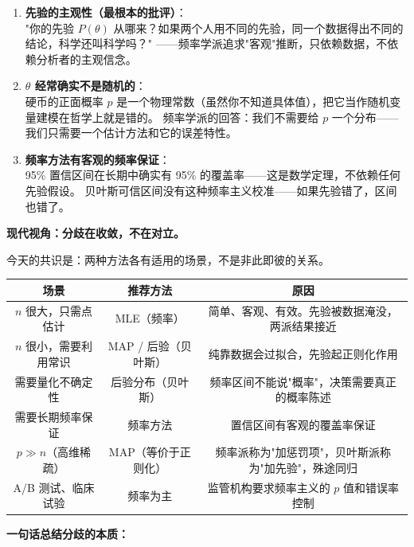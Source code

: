 \begin{enumerate}[label=(\arabic*)]
    \item \textbf{先验的主观性（最根本的批评）}：\\
    "你的先验 $P(\theta)$ 从哪来？如果两个人用不同的先验，同一个数据得出不同的结论，科学还叫科学吗？"
    ——频率学派追求"客观"推断，只依赖数据，不依赖分析者的主观信念。

    \item \textbf{$\theta$ 经常确实不是随机的}：\\
    硬币的正面概率 $p$ 是一个物理常数（虽然你不知道具体值），把它当作随机变量建模在哲学上就是错的。
    频率学派的回答：我们不需要给 $p$ 一个分布——我们只需要一个估计方法和它的误差特性。

    \item \textbf{频率方法有客观的频率保证}：\\
    95\% 置信区间在长期中确实有 95\% 的覆盖率——这是数学定理，不依赖任何先验假设。
    贝叶斯可信区间没有这种频率主义校准——如果先验错了，区间也错了。
\end{enumerate}

\medskip
\textbf{现代视角：分歧在收敛，不在对立。}

今天的共识是：两种方法各有适用的场景，不是非此即彼的关系。

\begin{center}
\renewcommand{\arraystretch}{1.4}
\begin{tabular}{c|c|c}
\toprule
\textbf{场景} & \textbf{推荐方法} & \textbf{原因} \\
\midrule
$n$ 很大，只需点估计 & MLE（频率） & 简单、客观、有效。先验被数据淹没，两派结果接近 \\
\midrule
$n$ 很小，需要利用常识 & MAP / 后验（贝叶斯） & 纯靠数据会过拟合，先验起正则化作用 \\
\midrule
需要量化不确定性 & 后验分布（贝叶斯） & 频率区间不能说"概率"，决策需要真正的概率陈述 \\
\midrule
需要长期频率保证 & 频率方法 & 置信区间有客观的覆盖率保证 \\
\midrule
$p \gg n$（高维稀疏） & MAP（等价于正则化） & 频率派称为"加惩罚项"，贝叶斯派称为"加先验"，殊途同归 \\
\midrule
A/B 测试、临床试验 & 频率为主 & 监管机构要求频率主义的 $p$ 值和错误率控制 \\
\bottomrule
\end{tabular}
\end{center}

\textbf{一句话总结分歧的本质：}

